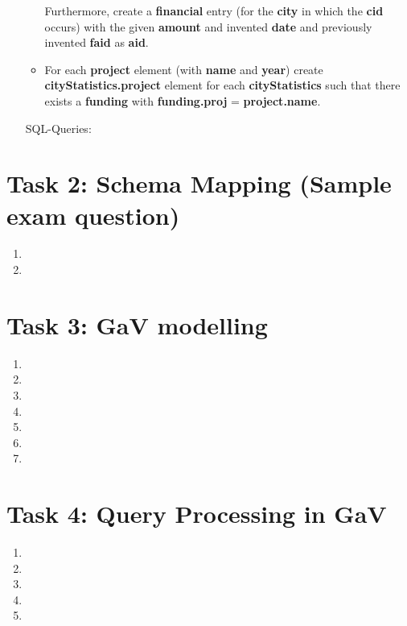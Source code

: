 \documentclass{scrartcl}
\begin{document}
\begin{enumerate}
\begin{itemize}
			Furthermore, create a \textbf{financial} entry (for the \textbf{city} in which the \textbf{cid} occurs) with the given \textbf{amount} and invented \textbf{date} and previously invented \textbf{faid} as \textbf{aid}.
			
			\item For each \textbf{project} element (with \textbf{name} and \textbf{year}) create \textbf{cityStatistics.project} element for each \textbf{cityStatistics} such that there exists a \textbf{funding} with \textbf{funding.proj} = \textbf{project.name}.
		\end{itemize}
		SQL-Queries:
		\begin{center}
		\end{center}
	\end{enumerate}
	
	\section*{Task 2: Schema Mapping (Sample exam question)}
	\begin{enumerate}
		\item 
		
		\item 
	\end{enumerate}
	
	\section*{Task 3: GaV modelling}
	\begin{enumerate}
		\item 
		
		\item 
		
		\item 
		
		\item 
		
		\item 
		
		\item 
		
		\item 
	\end{enumerate}
	
	\section*{Task 4: Query Processing in GaV}
	\begin{enumerate}
		\item 
		
		\item 
		
		\item 
		
		\item 
		
		\item 
	\end{enumerate}
\end{document}
